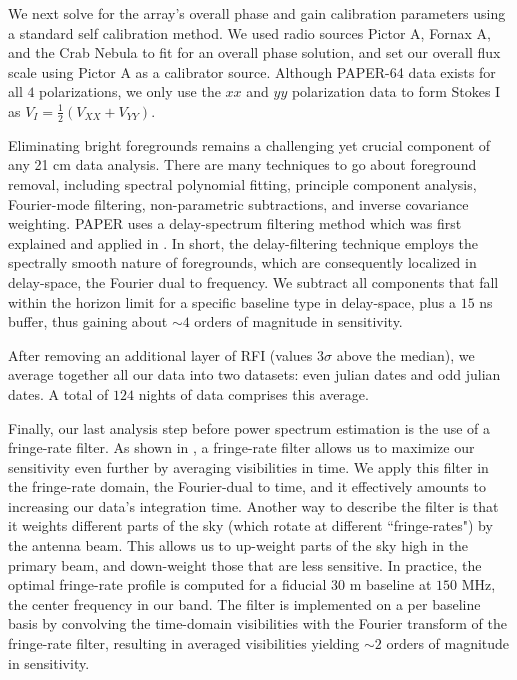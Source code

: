 \documentclass[preprint2,numberedappendix,tighten,twocolappendix]{aastex6}  %
\begin{document}
We next solve for the array's overall phase and gain calibration parameters using a standard self calibration method. We used radio sources Pictor A, Fornax A, and the Crab Nebula to fit for an overall phase solution, and set our overall flux scale using Pictor A as a calibrator source. Although PAPER-64 data exists for all $4$ polarizations, we only use the $xx$ and $yy$ polarization data to form Stokes I as $V_{I} = \frac{1}{2}(V_{XX} + V_{YY})$.

Eliminating bright foregrounds remains a challenging yet crucial component of any 21 cm data analysis. There are many techniques to go about foreground removal, including spectral polynomial fitting, principle component analysis, Fourier-mode filtering, non-parametric subtractions, and inverse covariance weighting. PAPER uses a delay-spectrum filtering method which was first explained and applied in \citet{parsons_et_al2014}. In short, the delay-filtering technique employs the spectrally smooth nature of foregrounds, which are consequently localized in delay-space, the Fourier dual to frequency. We subtract all components that fall within the horizon limit for a specific baseline type in delay-space, plus a $15$ ns buffer, thus gaining about $\sim4$ orders of magnitude in sensitivity. 

After removing an additional layer of RFI (values $3\sigma$ above the median), we average together all our data into two datasets: even julian dates and odd julian dates. A total of $124$ nights of data comprises this average.

Finally, our last analysis step before power spectrum estimation is the use of a fringe-rate filter. As shown in \citet{parsons_et_al2016}, a fringe-rate filter allows us to maximize our sensitivity even further by averaging visibilities in time. We apply this filter in the fringe-rate domain, the Fourier-dual to time, and it effectively amounts to increasing our data's integration time. Another way to describe the filter is that it weights different parts of the sky (which rotate at different ``fringe-rates") by the antenna beam. This allows us to up-weight parts of the sky high in the primary beam, and down-weight those that are less sensitive. In practice, the optimal fringe-rate profile is computed for a fiducial $30$ m baseline at $150$ MHz, the center frequency in our band. The filter is implemented on a per baseline basis by convolving the time-domain visibilities with the Fourier transform of the fringe-rate filter, resulting in averaged visibilities yielding $\sim 2$ orders of magnitude in sensitivity. 
\end{document}
